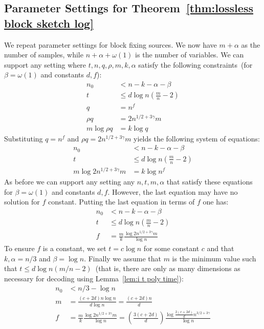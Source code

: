 \documentclass[11pt]{article}
\newcommand{\thref}[1]{\mbox{Theorem~\ref{#1}}}
\newcommand{\lemref}[1]{\mbox{Lemma~\ref{#1}}}
\begin{document}
\subsection{Parameter Settings for \thref{thm:lossless block sketch log}}
\label{ssec:block params}
We repeat parameter settings for block fixing sources.  We now have $m+\alpha$ as the number of samples, while $n + \alpha+\omega(1)$ is the number of variables.  We can support any setting where $t, n, q, \rho, m, k, \alpha$ satisfy the following constraints~(for $\beta = \omega(1)$ and constants $d, f$):
\begin{align*}
n_0&< n -k  -\alpha -\beta\\
t&\leq d \log n\left(\frac{m}{n}-2\right)\\
q &= n^f\\
\rho q  &= 2n^{1/2+3\gamma}m\\
m\log \rho q &= k \log q
\end{align*}
Substituting $q = n^f$ and $\rho q = 2n^{1/2+3\gamma}m$ yields the following system of equations:
\begin{align*}
n_0&< n - k - \alpha -\beta\\
t&\leq d\log n\left(\frac{m}{n}-2\right)\\
m \log 2n^{1/2+3\gamma}m &= k \log n^f
\end{align*}
As before we can support any setting any $n, t, m, \alpha$ that satisfy these equations for $\beta = \omega(1)$ and constants $d, f$.  However, the last equation may have no solution for $f$ constant.  Putting the last equation in terms of $f$ one has:
\begin{align*}
n_0&< n -k  - \alpha - \beta \\
t&\leq d\log n\left(\frac{ m }{n} -2\right)\\
f &= \frac{m}{k}\frac{\log 2n^{1/2+3\gamma} m}{\log n}
\end{align*}
To ensure $f$ is a constant, we set $t = c \log n$ for some constant $c$ and that $k, \alpha = n/3$ and $\beta = \log n$.  Finally we assume that $m$ is the minimum value such that $t \leq  d \log n(m/n-2)$~(that is, there are only as many dimensions as necessary for decoding using \lemref{lem:i t poly time}):
\begin{align*}
n_0&< n/3 -  \log n\\
m &= \frac{(c+2d)n \log n}{d \log n} = \frac{(c+2d)n}{d}\\
f &= \frac{m}{k}\frac{\log 2n^{1/2+3\gamma}m}{\log n} = \left(\frac{3(c+2d)}{d}\right)\frac{\log \frac{2(c+2d)}{d} n^{3/2+3\gamma}}{\log n}
\end{align*}
\end{document}
